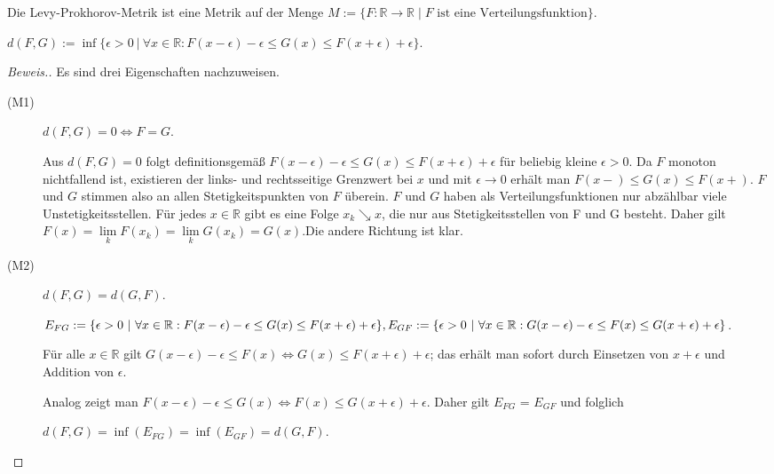 \begin{lemma}
    Die Levy-Prokhorov-Metrik ist eine Metrik auf der Menge $M:=\{F:\mathbb{R}\to\mathbb{R}\mid F \text{ ist eine Verteilungsfunktion}\}$.
    \begin{center}
        $d(F,G) := \inf\{\epsilon > 0~|~ \forall x \in \mathbb{R}: F(x-\epsilon) - \epsilon \leq G(x) \leq F(x+\epsilon) + \epsilon \}.$ 
    \end{center}
\end{lemma}
\begin{proof}[Beweis.] Es sind drei Eigenschaften nachzuweisen.
    \begin{description}
    \item[(M1)] $d(F,G) = 0 \Leftrightarrow F = G$.

    Aus $d(F,G) = 0$ folgt definitionsgemäß $F(x-\epsilon) - \epsilon \leq G(x) \leq F(x+\epsilon) + \epsilon$ für beliebig kleine $\epsilon > 0$. Da $F$ monoton nichtfallend ist, existieren der links- und rechtsseitige Grenzwert bei $x$ und mit $\epsilon \rightarrow 0$ erhält man $F(x-) \leq G(x) \leq F(x+)$. $F$ und $G$ stimmen also an allen Stetigkeitspunkten von $F$ überein. $F$ und $G$ haben als Verteilungsfunktionen nur abzählbar viele Unstetigkeitsstellen. Für jedes $x \in \mathbb{R}$ gibt es eine Folge $x_{k} \searrow x$, die nur aus Stetigkeitsstellen von F und G besteht. Daher gilt $F(x) = \lim\limits_{k}{F(x_k)} = \lim\limits_{k}{G(x_k)} = G(x)$.\newline Die andere Richtung ist klar.

    \item[(M2)] $d(F,G) = d(G,F)$.

    $E_{FG} := \{\epsilon > 0~|~\forall x \in \mathbb{R}: F(x-\epsilon) - \epsilon \leq G(x) \leq F(x+\epsilon) + \epsilon\},\newline E_{GF} := \{\epsilon > 0~|~\forall x \in \mathbb{R}: G(x-\epsilon) - \epsilon \leq F(x) \leq G(x+\epsilon) + \epsilon\}$.

    Für alle $x \in \mathbb{R}$ gilt $G(x-\epsilon) - \epsilon \leq F(x) \Leftrightarrow G(x) \leq F(x+\epsilon) + \epsilon$; das erhält man sofort durch Einsetzen von $x+\epsilon$ und Addition von $\epsilon.$

    Analog zeigt man $F(x-\epsilon) - \epsilon \leq G(x) \Leftrightarrow F(x) \leq G(x+\epsilon) + \epsilon$. Daher gilt $E_{FG}$ = $E_{GF}$ und folglich 
    \begin{center}
        $d(F,G) = \inf(E_{FG}) = \inf(E_{GF}) = d(G,F).$
    \end{center}


\end{description}
\end{proof}
